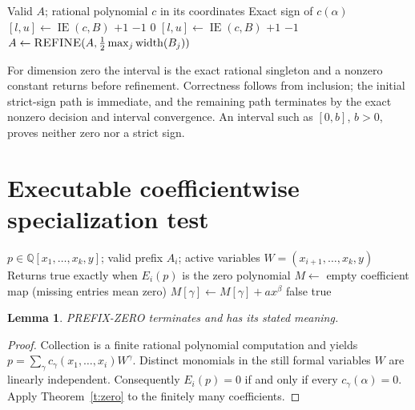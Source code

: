 \documentclass[11pt]{article}
\newtheorem{lemma}[theorem]{Lemma}
\theoremstyle{definition}
\newcommand{\QQ}{\mathbb Q}
\newcommand{\Eval}{\operatorname{IE}}
\newcommand{\width}{\operatorname{width}}
\newcommand{\alg}[1]{\textsc{#1}}
\begin{document}
\begin{algorithm}[H]
\caption{POINT-SIGN}\label{a:sign}
\begin{algorithmic}[1]
\Require Valid $A$; rational polynomial $c$ in its coordinates
\Ensure Exact sign of $c(\alpha)$
\State $[l,u]\gets\Eval(c,B)$
 \State \Return $+1$ \EndIf
{} \State \Return $-1$ \EndIf
\If{$\alg{POINT-ZERO}(c,A)$} \State \Return $0$ \EndIf
\Loop
 \State $[l,u]\gets\Eval(c,B)$
  \State \Return $+1$ \EndIf
  \State \Return $-1$ \EndIf
 \State $A\gets\alg{REFINE}(A,\frac12\max_j\width(B_j))$
\EndLoop
\end{algorithmic}
\end{algorithm}
For dimension zero the interval is the exact rational singleton and a nonzero
constant returns before refinement. Correctness follows from inclusion;
the initial strict-sign path is immediate, and the remaining path terminates
by the exact nonzero decision and interval convergence. An interval such as $[0,b]$, $b>0$, proves neither zero nor a strict sign.

\section{Executable coefficientwise specialization test}
\begin{algorithm}[H]
\caption{PREFIX-ZERO: no irrational substitution}\label{a:prefix}
\begin{algorithmic}[1]
\Require $p\in\QQ[x_1,\ldots,x_k,y]$; valid prefix $A_i$; active variables
$W=(x_{i+1},\ldots,x_k,y)$
\Ensure Returns true exactly when $E_i(p)$ is the zero polynomial
\State $M\gets$ empty coefficient map (missing entries mean zero)
 \State $M[\gamma]\gets M[\gamma]+a x^\beta$ 
\EndFor
{}
 \If{not $\alg{POINT-ZERO}(c,A_i)$} \State \Return false \EndIf
\EndFor
\State \Return true
\end{algorithmic}
\end{algorithm}
\begin{lemma}
PREFIX-ZERO terminates and has its stated meaning.
\end{lemma}
\begin{proof}
Collection is a finite rational polynomial computation and yields
$p=\sum_\gamma c_\gamma(x_1,\ldots,x_i)W^\gamma$.
Distinct monomials in the still formal variables $W$ are linearly independent.
Consequently $E_i(p)=0$ if and only if every $c_\gamma(\alpha)=0$.
Apply Theorem~\ref{t:zero} to the finitely many coefficients.
\end{proof}
\end{document}

